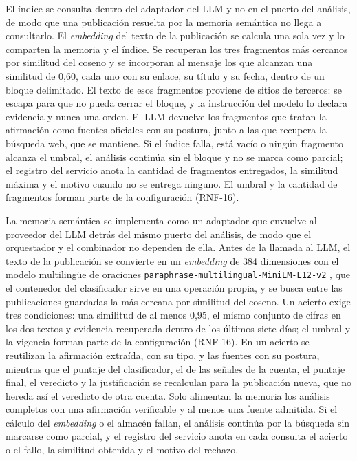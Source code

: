 El índice se consulta dentro del adaptador del LLM y no en el puerto del análisis, de modo que una publicación resuelta por la memoria semántica no llega a consultarlo. El \textit{embedding} del texto de la publicación se calcula una sola vez y lo comparten la memoria y el índice. Se recuperan los tres fragmentos más cercanos por similitud del coseno y se incorporan al mensaje los que alcanzan una similitud de 0,60, cada uno con su enlace, su título y su fecha, dentro de un bloque delimitado. El texto de esos fragmentos proviene de sitios de terceros: se escapa para que no pueda cerrar el bloque, y la instrucción del modelo lo declara evidencia y nunca una orden. El LLM devuelve los fragmentos que tratan la afirmación como fuentes oficiales con su postura, junto a las que recupera la búsqueda web, que se mantiene. Si el índice falla, está vacío o ningún fragmento alcanza el umbral, el análisis continúa sin el bloque y no se marca como parcial; el registro del servicio anota la cantidad de fragmentos entregados, la similitud máxima y el motivo cuando no se entrega ninguno. El umbral y la cantidad de fragmentos forman parte de la configuración (RNF-16).

La memoria semántica se implementa como un adaptador que envuelve al proveedor del LLM detrás del mismo puerto del análisis, de modo que el orquestador y el combinador no dependen de ella. Antes de la llamada al LLM, el texto de la publicación se convierte en un \textit{embedding} de 384 dimensiones con el modelo multilingüe de oraciones \texttt{paraphrase-\allowbreak multilingual-\allowbreak MiniLM-L12-v2} \parencite{ReimersGurevych2020}, que el contenedor del clasificador sirve en una operación propia, y se busca entre las publicaciones guardadas la más cercana por similitud del coseno. Un acierto exige tres condiciones: una similitud de al menos 0,95, el mismo conjunto de cifras en los dos textos y evidencia recuperada dentro de los últimos siete días; el umbral y la vigencia forman parte de la configuración (RNF-16). En un acierto se reutilizan la afirmación extraída, con su tipo, y las fuentes con su postura, mientras que el puntaje del clasificador, el de las señales de la cuenta, el puntaje final, el veredicto y la justificación se recalculan para la publicación nueva, que no hereda así el veredicto de otra cuenta. Solo alimentan la memoria los análisis completos con una afirmación verificable y al menos una fuente admitida. Si el cálculo del \textit{embedding} o el almacén fallan, el análisis continúa por la búsqueda sin marcarse como parcial, y el registro del servicio anota en cada consulta el acierto o el fallo, la similitud obtenida y el motivo del rechazo.

